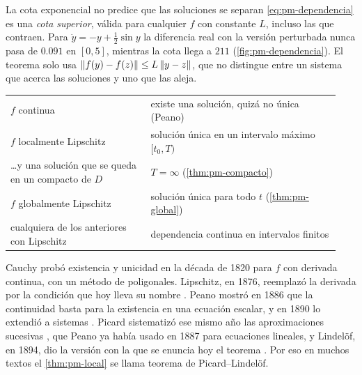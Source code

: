 \begin{trampa}[label=tr:pm-cotaexp]{La cota exponencial no predice que las soluciones se separan}
\eqref{eq:pm-dependencia} es una \emph{cota superior}, válida para cualquier $f$ con constante $L$, incluso las que contraen. Para $\dot y=-y+\tfrac12\sin y$ la diferencia real con la versión perturbada nunca pasa de $0.091$ en $[0,5]$, mientras la cota llega a $211$ (\cref{fig:pm-dependencia}). El teorema solo usa $\left\lVert f(y)-f(z)\right\rVert\le L\left\lVert y-z\right\rVert$, que no distingue entre un sistema que acerca las soluciones y uno que las aleja.
\end{trampa}


\begin{ideaclave}
\begin{tabular}{@{}>{\raggedright\arraybackslash}p{0.40\linewidth}>{\raggedright\arraybackslash}p{0.54\linewidth}@{}}
$f$ continua & existe una solución, quizá no única (Peano)\\
$f$ localmente Lipschitz & solución única en un intervalo máximo $[t_0,T)$\\
\quad\dots y una solución que se queda en un compacto de $D$ & $T=\infty$ (\cref{thm:pm-compacto})\\
$f$ globalmente Lipschitz & solución única para todo $t$ (\cref{thm:pm-global})\\
cualquiera de los anteriores con Lipschitz & dependencia continua en intervalos finitos
\end{tabular}
\end{ideaclave}

\begin{historia}
Cauchy probó existencia y unicidad en la década de 1820 para $f$ con derivada continua, con un método de poligonales. Lipschitz, en 1876, reemplazó la derivada por la condición que hoy lleva su nombre \citep{Lip1876}. Peano mostró en 1886 que la continuidad basta para la existencia en una ecuación escalar, y en 1890 lo extendió a sistemas \citep{Pea1890}. Picard sistematizó ese mismo año las aproximaciones sucesivas \citep{Pic1890}, que Peano ya había usado en 1887 para ecuaciones lineales, y Lindelöf, en 1894, dio la versión con la que se enuncia hoy el teorema \citep{Lin1894}. Por eso en muchos textos el \cref{thm:pm-local} se llama teorema de Picard--Lindelöf.
\end{historia}
